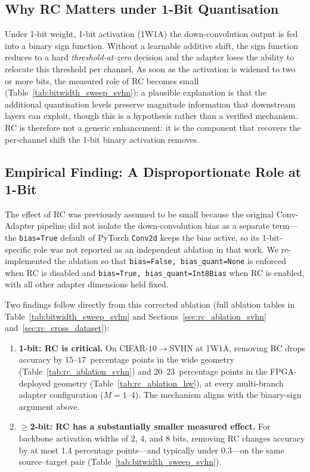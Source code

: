 \documentclass[12pt, a4paper]{report}
\numberwithin{equation}{chapter}
\numberwithin{figure}{chapter}
\numberwithin{table}{chapter}
\numberwithin{algorithm}{chapter}
\begin{document}
\subsection{Why RC Matters under 1-Bit Quantisation}

Under 1-bit weight, 1-bit activation (1W1A) the down-convolution output is fed into a binary sign function. Without a learnable additive shift, the sign function reduces to a hard \emph{threshold-at-zero} decision and the adapter loses the ability to relocate this threshold per channel. As soon as the activation is widened to two or more bits, the measured role of RC becomes small (Table~\ref{tab:bitwidth_sweep_svhn}); a plausible explanation is that the additional quantisation levels preserve magnitude information that downstream layers can exploit, though this is a hypothesis rather than a verified mechanism. RC is therefore not a generic enhancement: it is the component that recovers the per-channel shift the 1-bit binary activation removes.

\subsection{Empirical Finding: A Disproportionate Role at 1-Bit}

The effect of RC was previously assumed to be small because the original Conv-Adapter pipeline did not isolate the down-convolution bias as a separate term---the \texttt{bias=True} default of PyTorch \texttt{Conv2d} keeps the bias active, so its 1-bit-specific role was not reported as an independent ablation in that work. We re-implemented the ablation so that \texttt{bias=False, bias\_quant=None} is enforced when RC is disabled and \texttt{bias=True, bias\_quant=Int8Bias} when RC is enabled, with all other adapter dimensions held fixed.

Two findings follow directly from this corrected ablation (full ablation tables in Table~\ref{tab:bitwidth_sweep_svhn} and Sections~\ref{sec:rc_ablation_svhn} and~\ref{sec:rc_cross_dataset}):
\begin{enumerate}
    \item \textbf{1-bit: RC is critical.} On CIFAR-10$\to$SVHN at 1W1A, removing RC drops accuracy by $15$--$17$~percentage points in the wide geometry (Table~\ref{tab:rc_ablation_svhn}) and $20$--$23$~percentage points in the FPGA-deployed geometry (Table~\ref{tab:rc_ablation_hw}), at every multi-branch adapter configuration ($M{=}1$--$4$). The mechanism aligns with the binary-sign argument above.
    \item \textbf{$\geq$2-bit: RC has a substantially smaller measured effect.} For backbone activation widths of 2, 4, and 8 bits, removing RC changes accuracy by at most 1.4 percentage points---and typically under 0.3---on the same source--target pair (Table~\ref{tab:bitwidth_sweep_svhn}).
\end{enumerate}
\end{document}

